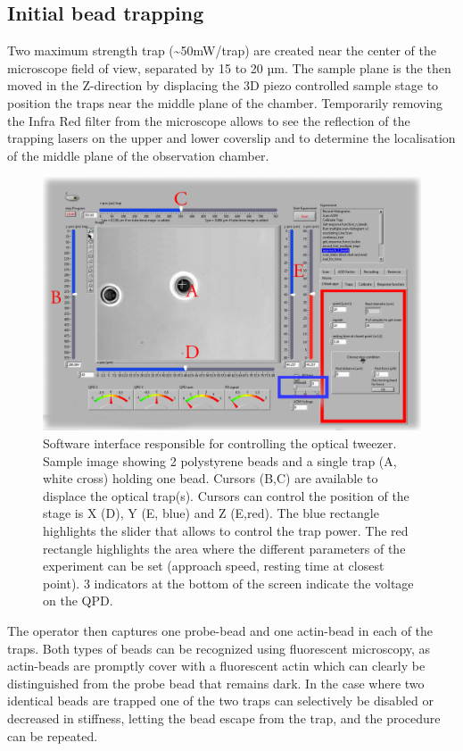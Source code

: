 \documentclass[A4paperpaper,11pt,english]{sphinxmanual}
\begin{document}
\subsection{Initial bead trapping}
\label{index-latex:initial-bead-trapping}
Two maximum strength trap (\textasciitilde{}50mW/trap) are created near the center of the
microscope field of view, separated by 15 to 20 µm. The sample plane is the then moved in
the Z-direction by displacing the 3D piezo controlled sample stage to position the traps
near the middle plane of the chamber. Temporarily removing the Infra Red filter
from the microscope allows to see the reflection of the trapping lasers on the
upper and lower coverslip and to determine the localisation of the middle plane
of the observation chamber.
\begin{figure}[htbp]
\centering
\capstart

\includegraphics[width=0.900\linewidth]{frontend.png}
\caption{Software interface responsible for controlling the optical tweezer.  Sample
image showing 2 polystyrene beads and a single trap (A, white cross) holding one bead.
Cursors (B,C) are available to displace the optical trap(s).  Cursors can
control the position of the stage is X (D), Y (E, blue) and Z (E,red).
The blue rectangle highlights the slider that allows to control the trap power.  The red
rectangle highlights the area where the different parameters of the experiment
can be set (approach speed, resting time at closest point). 3 indicators at
the bottom of the screen indicate the voltage on the QPD.}\label{index-latex:fig-frontend}\end{figure}

The operator then captures one probe-bead and one actin-bead in each of the
traps.  Both types of beads can be recognized using fluorescent microscopy, as
actin-beads are promptly cover with a fluorescent actin
which  can clearly be distinguished from the probe bead that remains dark.
In the case where two identical beads are trapped one of the two traps can selectively
be disabled or decreased in stiffness, letting the bead escape from  the trap,
and the procedure can be repeated.
\end{document}
